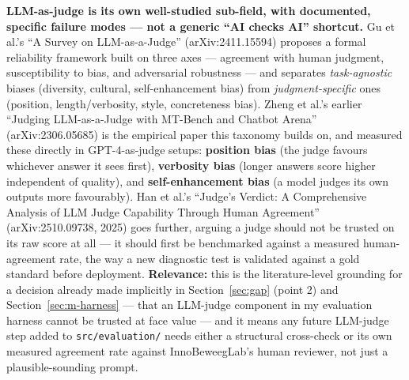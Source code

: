 \textbf{LLM-as-judge is its own well-studied sub-field, with documented, specific failure modes — not a generic \textquotedblleft{}AI checks AI\textquotedblright{} shortcut.} Gu et al.'s \textquotedblleft{}A Survey on LLM-as-a-Judge\textquotedblright{} (arXiv:2411.15594) proposes a formal reliability framework built on three axes — agreement with human judgment, susceptibility to bias, and adversarial robustness — and separates \textit{task-agnostic} biases (diversity, cultural, self-enhancement bias) from \textit{judgment-specific} ones (position, length/verbosity, style, concreteness bias). Zheng et al.'s earlier \textquotedblleft{}Judging LLM-as-a-Judge with MT-Bench and Chatbot Arena\textquotedblright{} (arXiv:2306.05685) is the empirical paper this taxonomy builds on, and measured these directly in GPT-4-as-judge setups: \textbf{position bias} (the judge favours whichever answer it sees first), \textbf{verbosity bias} (longer answers score higher independent of quality), and \textbf{self-enhancement bias} (a model judges its own outputs more favourably). Han et al.'s \textquotedblleft{}Judge's Verdict: A Comprehensive Analysis of LLM Judge Capability Through Human Agreement\textquotedblright{} (arXiv:2510.09738, 2025) goes further, arguing a judge should not be trusted on its raw score at all — it should first be benchmarked against a measured human-agreement rate, the way a new diagnostic test is validated against a gold standard before deployment. \textbf{Relevance:} this is the literature-level grounding for a decision already made implicitly in Section~\ref{sec:gap} (point 2) and Section~\ref{sec:m-harness} — that an LLM-judge component in my evaluation harness cannot be trusted at face value — and it means any future LLM-judge step added to \texttt{src/evaluation/} needs either a structural cross-check or its own measured agreement rate against InnoBeweegLab's human reviewer, not just a plausible-sounding prompt.



